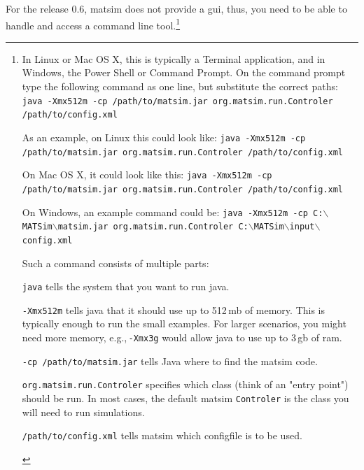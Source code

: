 For the release 0.6, \gls{matsim} does not provide a \gls{gui}, thus, you need to be able to handle and access a command line tool.\footnote{%
%
\baselineskip
\parindent0pt
%
In Linux or Mac OS X, this is typically a Terminal application, and in Windows, the Power Shell or Command Prompt.
%
On the command prompt type the following command as one line, but substitute the correct paths: 
\lstinline|java -Xmx512m -cp /path/to/matsim.jar org.matsim.run.Controler /path/to/config.xml|

As an example, on Linux this could look like: 
\lstinline|java -Xmx512m -cp /path/to/matsim.jar org.matsim.run.Controler /path/to/config.xml|

On Mac OS X, it could look like this: 
\lstinline|java -Xmx512m -cp /path/to/matsim.jar org.matsim.run.Controler /path/to/config.xml|

On Windows, an example command could be: 
\lstinline{java -Xmx512m -cp C:}$\backslash$\lstinline{MATSim}$\backslash$\lstinline{matsim.jar org.matsim.run.Controler C:}$\backslash$\lstinline{MATSim}$\backslash$\lstinline{input}$\backslash$\lstinline{config.xml}

Such a command consists of multiple parts:
\begin{compactitem}
\item \lstinline|java| tells the system that you want to run \gls{java}.
\item \lstinline|-Xmx512m| tells \gls{java} that it should use up to 512\,\gls{mb} of memory. This is typically enough to run the small examples. For larger \glspl{scenario}, you might need more memory, e.g.,\,\lstinline|-Xmx3g| would allow \gls{java} to use up to 3\,\gls{gb} of \gls{ram}.
\item \lstinline|-cp /path/to/matsim.jar| tells Java where to find the \gls{matsim} code.
\item \lstinline|org.matsim.run.Controler| specifies which class (think of an "entry point") should be run. In most cases, the default \gls{matsim} \lstinline|Controler| is the class you will need to run simulations.
\item \lstinline|/path/to/config.xml| tells \gls{matsim} which \gls{configfile} is to be used. 
\end{compactitem}

}

